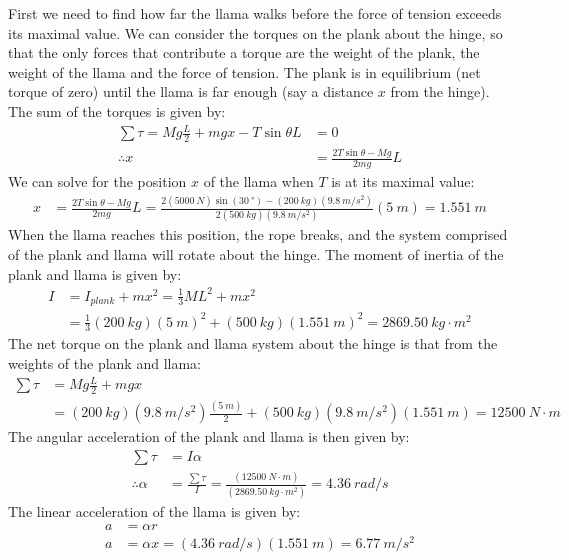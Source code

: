 \begin{solution}
First we need to find how far the llama walks before the force of tension exceeds its maximal value. We can consider the torques on the plank about the hinge, so that the only forces that contribute a torque are the weight of the plank, the weight of the llama and the force of tension. The plank is in equilibrium (net torque of zero) until the llama is far enough (say a distance $x$ from the hinge). The sum of the torques is given by:
\begin{align*}
\sum \tau = Mg\frac{L}{2}+mgx-T\sin\theta L &= 0\\
\therefore x &= \frac{2T\sin\theta -Mg}{2mg}L
\end{align*}
We can solve for the position $x$ of the llama when $T$ is at its maximal value:
\begin{align*}
x &= \frac{2T\sin\theta -Mg}{2mg}L= \frac{2(\SI{5000}{N})\sin(\SI{30}{\degree})-(\SI{200}{kg})(\SI{9.8}{m/s^2})}{2(\SI{500}{kg})(\SI{9.8}{m/s^2})} (\SI{5}{m})= \SI{1.551}{m}
\end{align*}
When the llama reaches this position, the rope breaks, and the system comprised of the plank and llama will rotate about the hinge. The moment of inertia of the plank and llama is given by:
\begin{align*}
I&=I_{plank}+mx^2=\frac{1}{3}ML^2+mx^2\\
&=\frac{1}{3}(\SI{200}{kg})(\SI{5}{m})^2+(\SI{500}{kg})(\SI{1.551}{m})^2=\SI{2869.50}{kg\cdot m^2}
\end{align*}
The net torque on the plank and llama system about the hinge is that from the weights of the plank and llama:
\begin{align*}
\sum\tau &=  Mg\frac{L}{2}+mgx
\\&= (\SI{200}{kg})(\SI{9.8}{m/s^2})\frac{(\SI{5}{m})}{2}+(\SI{500}{kg})(\SI{9.8}{m/s^2})(\SI{1.551}{m})=\SI{12500}{N\cdot m}
\end{align*}
The angular acceleration of the plank and llama is then given by:
\begin{align*}
\sum\tau &= I\alpha\\
\therefore \alpha &= \frac{\sum\tau}{I}=\frac{(\SI{12500}{N\cdot m})}{(\SI{2869.50}{kg\cdot m^2})}=\SI{4.36}{rad/s}
\end{align*}
The linear acceleration of the llama is given by:
\begin{align*}
a &= \alpha r\\
a &= \alpha x = (\SI{4.36}{rad/s})(\SI{1.551}{m}) =\SI{6.77}{m/s^2}
\end{align*}
\end{solution}



